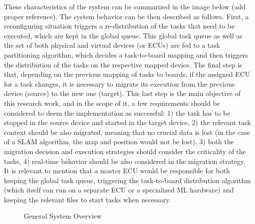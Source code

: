 These characteristics of the system can be summarized in the image below (add proper reference). The system behavior can be then described as follows. First, a reconfiguring situation triggers a re-distribution of the tasks that need to be executed, which are kept in the global queue. This global task queue as well as the set of both physical and virtual devices (or ECUs) are fed to a task partitioning algorithm, which decides a task-to-board mapping and then triggers the distribution of the tasks on the respective mapped device. The final step is that, depending on the previous mapping of tasks to boards, if the assigned ECU for a task changes, it is necessary to migrate its execution from the previous device (source) to the new one (target). This last step is the main objective of this research work, and in the scope of it, a few requirements should be considered to deem the implementation as successful: 1) the task has to be stopped in the source device and started in the target device, 2) the relevant task context should be also migrated, meaning that no crucial data is lost (in the case of a SLAM algorithm, the map and position would not be lost), 3) both the migration decision and execution strategies should consider the criticality of the tasks, 4) real-time behavior should be also considered in the migration strategy. It is relevant to mention that a master ECU would be responsible for both keeping the global task queue, triggering the task-to-board distribution algorithm (which itself can run on a separate ECU or a specialized ML hardware) and keeping the relevant files to start tasks when necessary.
 

\begin{figure}
	\centering

	\caption{General System Overview}
	\label{fig:mig_diag}
\end{figure}

